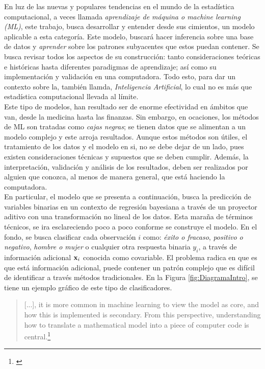 \documentclass[../Main/Main.tex]{subfiles}
\begin{document}
En luz de las nuevas y populares tendencias en el mundo de la estadística computacional, a veces llamada \textit{aprendizaje de máquina o machine learning (ML)}, este trabajo, busca desarrollar y entender desde sus cimientos, un modelo aplicable a esta categoría. Este modelo, buscará hacer inferencia sobre una base de datos y \textit{aprender} sobre los patrones subyacentes que estos puedan contener. Se busca revisar todos los aspectos de su construcción: tanto consideraciones teóricas e históricas hasta diferentes paradigmas de aprendizaje; así como su implementación y validación en una computadora. Todo esto, para dar un contexto sobre la, también llamda, \textit{Inteligencia Artificial}, lo cual no es más que estadística computacional llevada al límite. \\

Este tipo de modelos, han resultado ser de enorme efectividad en  ámbitos que van, desde la medicina hasta las finanzas. Sin embargo, en ocaciones, los métodos de ML son tratadas como \textit{cajas negras}; se tienen datos que se alimentan a un modelo complejo y este arroja resultados. Aunque estos métodos son útiles, el tratamiento de los datos y el modelo en si, no se debe dejar de un lado, pues existen consideraciones técnicas y supuestos que se deben cumplir. Además, la interpretación, validación y análisis de los resultados, deben ser realizados por alguien que conozca, al menos de manera general, que está haciendo la computadora.\\

En particular, el modelo que se presenta a continuación, busca la predicción de variables binarias en un contexto de regresión bayesiana a través de un proyector aditivo con una transformación no lineal de los datos. Esta maraña de términos técnicos, se ira esclareciendo poco a poco conforme se construye el modelo. En el fondo, se busca clasificar cada observación $i$ como: \textit{éxito o fracaso}, \textit{positivo o negativo}, \textit{hombre o mujer} o cualquier otra respuesta binaria $y_i$, a través de información adicional $\mathbf{x}_i$ conocida como covariable. El problema radica en que es que está información adicional, puede contener un patrón complejo que es difícil de identificar a través métodos tradicionales. En la Figura \ref{fig:DiagramaIntro}, se tiene un ejemplo gráfico de este tipo de clasificadores. 

\begin{quote}
	[...], it is more common in machine learning to view the model as core, and how this is implemented
is secondary. From this perspective, understanding how to translate a mathematical model into a piece of
computer code is central.\footnote{\autocite{barber2012bayesian}}
\end{quote}
\end{document}
